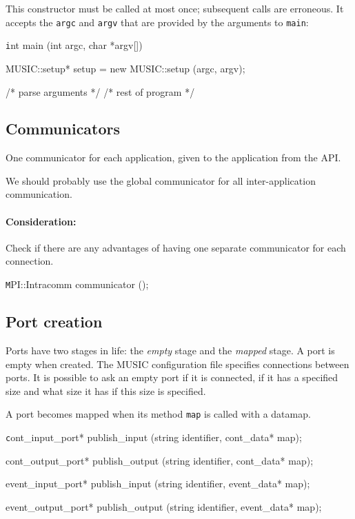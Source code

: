 \documentclass[a4paper]{report}
\newenvironment{metatext}%
{\color{blue}}%
{}
\newenvironment{head}%
{\texttt}%
{}
\newenvironment{code}%
{\texttt}%
{}
\begin{document}
This constructor must be called at most once; subsequent calls are
erroneous.  It accepts the \verb|argc| and \verb|argv| that are
provided by the arguments to \verb|main|:

\begin{code}
int main (int argc, char *argv[])
{
  MUSIC::setup* setup = new MUSIC::setup (argc, argv);

  /* parse arguments */
  /* rest of program */
}
\end{code}

\subsection{Communicators}

One communicator for each application, given to the application from
the API.

We should probably use the global communicator for all
inter-application communication.

\begin{metatext}
  \paragraph{Consideration:} Check if there are any advantages of having one
  separate communicator for each connection.
\end{metatext}

\begin{head}
    MPI::Intracomm communicator ();
\end{head}

\begin{code}
\end{code}

\subsection{Port creation}

Ports have two stages in life: the \emph{empty} stage and the
\emph{mapped} stage.  A port is empty when created.  The MUSIC
configuration file specifies connections between ports.  It is
possible to ask an empty port if it is connected, if it has a
specified size and what size it has if this size is specified.

A port becomes mapped when its method \verb|map| is called with a
datamap.

\begin{head}
    cont\_input\_port* publish\_input (string identifier, cont\_data* map);

    cont\_output\_port* publish\_output (string identifier, cont\_data* map);

    event\_input\_port* publish\_input (string identifier, event\_data* map);

    event\_output\_port* publish\_output (string identifier, event\_data* map);
\end{head}
\end{document}
